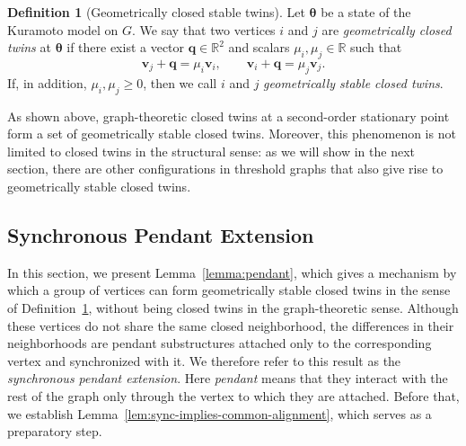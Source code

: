 \documentclass[11pt,reqno]{amsart}
\theoremstyle{definition}
\newtheorem{definition}[theorem]{Definition}
\begin{document}
\begin{definition}[Geometrically closed stable twins]\label{def:geometric_twins}
Let $\boldsymbol{\theta}$ be a state of the Kuramoto model on $G$.
We say that two vertices $i$ and $j$ are \emph{geometrically closed twins}
at $\boldsymbol{\theta}$ if there exist a vector $\boldsymbol q\in\mathbb R^2$
and scalars $\mu_i,\mu_j\in\mathbb R$ such that
\[
    \boldsymbol v_j+\boldsymbol q=\mu_i \boldsymbol v_i,
    \qquad
    \boldsymbol v_i+\boldsymbol q=\mu_j \boldsymbol v_j .
\]
If, in addition, $\mu_i,\mu_j\geq 0$, then we call $i$ and $j$
\emph{geometrically stable closed twins}.
\end{definition}
As shown above, graph-theoretic closed twins at a second-order stationary point form a set of geometrically stable closed twins. Moreover, this phenomenon is not limited to closed twins in the structural sense: as we will show in the next section, there are other configurations in threshold graphs that also give rise
to geometrically stable closed twins.

\subsection{Synchronous Pendant Extension}\label{sec:sync-pendant}

In this section, we present Lemma~\ref{lemma:pendant}, which gives a mechanism by which a group of vertices can form geometrically stable closed twins in the sense of Definition~\ref{def:geometric_twins}, without being closed twins in the graph-theoretic sense. Although these vertices do not share the same closed neighborhood, the differences in their neighborhoods are pendant substructures attached only to the corresponding vertex and synchronized with it. We therefore refer to this result as the \emph{synchronous pendant extension}. Here \textit{pendant} means that they interact with the rest of the graph only through the vertex to which they are attached.
Before that, we establish Lemma~\ref{lem:sync-implies-common-alignment}, which serves as a preparatory step.
\end{document}
